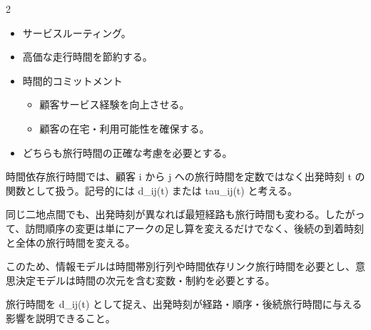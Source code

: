 \begin{multicols}{2}

\footnotesize

\raggedcolumns


\begin{itemize}
\item サービスルーティング。
\item 高価な走行時間を節約する。
\item 時間的コミットメント
\begin{itemize}
\item 顧客サービス経験を向上させる。
\item 顧客の在宅・利用可能性を確保する。
\end{itemize}
\item どちらも旅行時間の正確な考慮を必要とする。
\end{itemize}

時間依存旅行時間では、顧客 i から j への旅行時間を定数ではなく出発時刻 t の関数として扱う。記号的には d\_ij(t) または tau\_ij(t) と考える。\par

同じ二地点間でも、出発時刻が異なれば最短経路も旅行時間も変わる。したがって、訪問順序の変更は単にアークの足し算を変えるだけでなく、後続の到着時刻と全体の旅行時間を変える。\par

このため、情報モデルは時間帯別行列や時間依存リンク旅行時間を必要とし、意思決定モデルは時間の次元を含む変数・制約を必要とする。\par

旅行時間を d\_ij(t) として捉え、出発時刻が経路・順序・後続旅行時間に与える影響を説明できること。\par


\end{multicols}
